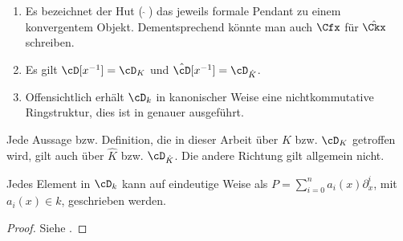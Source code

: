 \begin{bem}
\begin{enumerate}
\item Es bezeichnet der Hut ($ \, \hat \,\, $) das jeweils formale Pendant
zu einem konvergentem Objekt. Dementsprechend könnte man auch $\Cfx$ für
$\hat{\Ckx}$ schreiben.
\item Es gilt $\cD[x^{-1}]=\cD_K$ und $\hat \cD[x^{-1}]=\cD_{\hat K}$.
\item Offensichtlich erhält $\cD_k$ in kanonischer Weise eine nichtkommutative
Ringstruktur, dies ist in \cite[Kapittel 2 Section 1]{ZulaBarbara} genauer
ausgeführt.
\end{enumerate}
\end{bem}
\begin{bem} \label{bem:konvToFormal}
Jede Aussage bzw. Definition, die in dieser Arbeit über $K$ bzw. $\cD_K$
getroffen wird, gilt auch über $\hat K$ bzw. $\cD_{\hat K}$. Die andere
Richtung gilt allgemein nicht.
\end{bem}

\begin{prop} \label{prop:weyl_eindeutige_schreibung}
Jedes Element in $\cD_k$ kann auf eindeutige
Weise als $P=\sum_{i=0}^na_i(x)\partial_x^i$, mit $a_i(x)\in k$, geschrieben
werden.
\end{prop}
\begin{proof}
Siehe \cite[Proposition 1.2.3]{sabbah_cimpa90}.
\end{proof}
\begin{comment}
Gilt das folgende??
\[
\alpha_i(x)\partial_x^i \equiv \frac{\alpha_i}{x^i}(x\partial_x)^i \mod
F_{i-1}\cD
\]
\end{comment}

